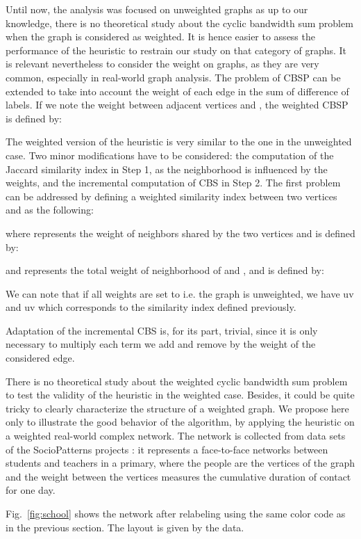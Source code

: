 \documentclass{scrartcl}
\theoremstyle{plain}
\newcommand{\cbs}{CBS}
\newcommand{\cbsp}{CBSP}
\begin{document}
Until now, the analysis was focused on unweighted graphs as up to our knowledge, 
there is no theoretical study about the cyclic bandwidth sum problem when the 
graph is considered as weighted. It is hence easier to assess the performance of 
the heuristic to restrain our study on that category of graphs. It is relevant 
nevertheless to consider the weight on graphs, as they are very common, 
especially in real-world graph analysis. The problem of \cbsp{} can be extended 
to take into account the weight of each edge in the sum of difference of labels. 
If we note  the weight between adjacent vertices  and , the 
weighted \cbsp{} is defined by:


The weighted version of the heuristic is very similar to the one in the 
unweighted case. Two minor modifications have to be considered: the computation 
of the Jaccard similarity index in Step 1, as the neighborhood is influenced by 
the 
weights, and the incremental computation of \cbs{} in Step 2. The first problem 
can be addressed by defining a weighted similarity index between two vertices 
 and  as the following: 

where  represents the weight of neighbors shared by the two vertices and 
is defined by:
 
and  represents the total weight of neighborhood of  and , and is 
defined by:

We can note that if all weights are set to  i.e. the graph is unweighted, we 
have uv and uv which corresponds to the 
similarity index defined previously.

Adaptation of the incremental \cbs{} is, for its part, trivial, since it is only 
necessary to multiply each term we add and remove by the weight of the 
considered edge. 

There is no theoretical study about the weighted cyclic bandwidth sum problem to 
test the validity of the heuristic in the weighted case. Besides, it could be 
quite tricky to clearly characterize the structure of a weighted graph. We 
propose here only to illustrate the good behavior of the algorithm, by applying 
the heuristic on a weighted real-world complex network. The network is collected 
from data sets of the SocioPatterns projects \cite{Fournet2014}: it represents 
a face-to-face 
networks between students and teachers in a primary, where the people are the 
vertices of the graph and the weight between the vertices measures the 
cumulative duration of contact for one day.

Fig.~\ref{fig:school} shows the network after relabeling using the same color 
code as in the previous section. The layout is given by the data.
\end{document}
